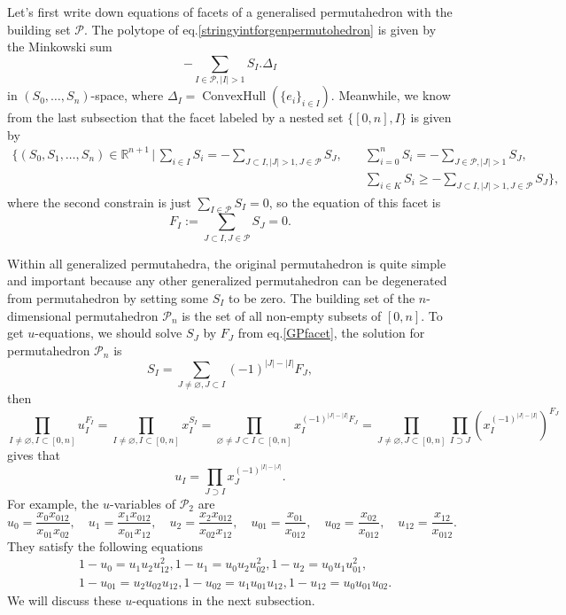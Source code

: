 \documentclass[hidelinks,12pt]{article}
\begin{document}
\begin{enumerate}
Let's first write down equations of facets of a generalised permutahedron
with the building set $\mathscr P$. The polytope of 
eq.\eqref{stringyintforgenpermutohedron} is given by the Minkowski sum
\[
	- \sum_{I\in\mathscr P,|I|>1}S_I.\Delta_I
\]
in $(S_0,\dots,S_n)$-space, where $\Delta_I=\operatorname{ConvexHull}
(\{e_i\}_{i\in I})$. Meanwhile, we know from the last subsection that the facet 
labeled by a nested set $\{[0,n],I\}$ is given by
\begin{align*}
	\biggl\{(S_0,S_1,\dots,S_n)\in \mathbb R^{n+1}\,\bigg |\,
		\sum_{i\in I}S_i = -\sum_{J\subset I,|J|>1,J\in \mathscr P}S_J,
		\quad
		&\sum_{i=0}^nS_i=-\sum_{J\in \mathscr P,|J|>1}S_J,\\
		&\sum_{i\in K}S_i\geq -\sum_{J\subset I,|J|>1,J\in \mathscr P}S_J
	\biggr\},
\end{align*}
where the second constrain is just $\sum_{I\in \mathscr P}S_I=0$, so the equation 
of this facet is 
\begin{equation}\label{GPfacet}
	F_I:=\sum_{J\subset I,J\in\mathscr P}S_J=0.
\end{equation}

Within all generalized permutahedra, the original permutahedron is quite simple
and important because any other generalized permutahedron can be degenerated from
permutahedron by setting some $S_I$ to be zero.
The building set of the $n$-dimensional permutahedron $\mathscr P_n$ is 
the set of all non-empty subsets of $[0,n]$. 
To get $u$-equations, we should solve $S_J$ by $F_J$ from eq.\eqref{GPfacet}, the 
solution for permutahedron $\mathscr P_n$ is 
\begin{equation}\label{SinF}
	S_I=\sum_{J\neq \varnothing,J\subset I} (-1)^{|J|-|I|}F_J,
\end{equation}
then
\[
	\prod_{I\neq \varnothing,I\subset [0,n]}u_I^{F_I}=
	\prod_{I\neq \varnothing,I\subset [0,n]}x_I^{S_I}=
	\prod_{\varnothing\neq J\subset I\subset [0,n]}
	x_I^{(-1)^{|J|-|I|}F_J}=
	\prod_{J\neq \varnothing,J\subset [0,n]}
	\prod_{I\supset J}(x_I^{(-1)^{|J|-|I|}})^{F_J}
\]
gives that
\[
	u_I=\prod_{J\supset I}x_J^{(-1)^{|I|-|J|}}.
\]
For example, the $u$-variables of $\mathscr P_2$ are
\[
	u_{0}  = \frac{x_0 x_{012}}{x_{01}x_{02}},\quad 
	u_{1}  = \frac{x_1 x_{012}}{x_{01}x_{12}},\quad
	u_{2}  = \frac{x_2 x_{012}}{x_{02}x_{12}},\quad
	u_{01} = \frac{x_{01}}{x_{012}},\quad 
	u_{02} = \frac{x_{02}}{x_{012}},\quad
	u_{12} = \frac{x_{12}}{x_{012}}.
\]
They satisfy the following equations
\begin{align*}
	&1-u_{0}=u_{1} u_{2} u_{12}^2,
	1-u_{1}=u_{0} u_{2} u_{02}^2,
	1-u_{2}=u_{0} u_{1} u_{01}^2,\\
	&1-u_{01}=u_{2} u_{02} u_{12},
	1-u_{02}=u_{1} u_{01} u_{12},
	1-u_{12}=u_{0} u_{01} u_{02}.
\end{align*}
We will discuss these $u$-equations in the next subsection.


\end{enumerate}
\end{document}
